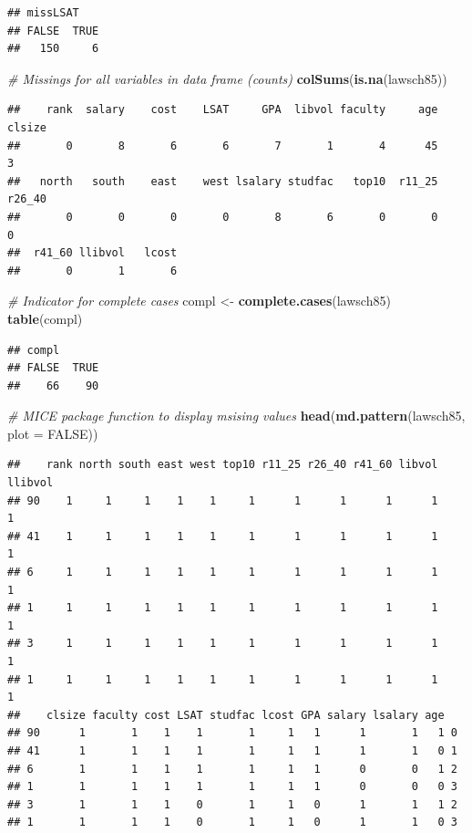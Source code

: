 \documentclass[]{book}
\newenvironment{Shaded}{\begin{snugshade}}{\end{snugshade}}
\newcommand{\CommentTok}[1]{\textcolor[rgb]{0.56,0.35,0.01}{\textit{#1}}}
\newcommand{\DataTypeTok}[1]{\textcolor[rgb]{0.13,0.29,0.53}{#1}}
\newcommand{\KeywordTok}[1]{\textcolor[rgb]{0.13,0.29,0.53}{\textbf{#1}}}
\newcommand{\NormalTok}[1]{#1}
\newcommand{\OtherTok}[1]{\textcolor[rgb]{0.56,0.35,0.01}{#1}}
\newcommand{\StringTok}[1]{\textcolor[rgb]{0.31,0.60,0.02}{#1}}
\begin{document}
\begin{verbatim}
## missLSAT
## FALSE  TRUE 
##   150     6
\end{verbatim}

\begin{Shaded}
\begin{Highlighting}[]
\CommentTok{# Missings for all variables in data frame (counts)}
\KeywordTok{colSums}\NormalTok{(}\KeywordTok{is.na}\NormalTok{(lawsch85))}
\end{Highlighting}
\end{Shaded}

\begin{verbatim}
##    rank  salary    cost    LSAT     GPA  libvol faculty     age  clsize 
##       0       8       6       6       7       1       4      45       3 
##   north   south    east    west lsalary studfac   top10  r11_25  r26_40 
##       0       0       0       0       8       6       0       0       0 
##  r41_60 llibvol   lcost 
##       0       1       6
\end{verbatim}

\begin{Shaded}
\begin{Highlighting}[]
\CommentTok{# Indicator for complete cases}
\NormalTok{compl <-}\StringTok{ }\KeywordTok{complete.cases}\NormalTok{(lawsch85)}
\KeywordTok{table}\NormalTok{(compl)}
\end{Highlighting}
\end{Shaded}

\begin{verbatim}
## compl
## FALSE  TRUE 
##    66    90
\end{verbatim}

\begin{Shaded}
\begin{Highlighting}[]
\CommentTok{# MICE package function to display msising values }
\KeywordTok{head}\NormalTok{(}\KeywordTok{md.pattern}\NormalTok{(lawsch85, }\DataTypeTok{plot =} \OtherTok{FALSE}\NormalTok{)) }
\end{Highlighting}
\end{Shaded}

\begin{verbatim}
##    rank north south east west top10 r11_25 r26_40 r41_60 libvol llibvol
## 90    1     1     1    1    1     1      1      1      1      1       1
## 41    1     1     1    1    1     1      1      1      1      1       1
## 6     1     1     1    1    1     1      1      1      1      1       1
## 1     1     1     1    1    1     1      1      1      1      1       1
## 3     1     1     1    1    1     1      1      1      1      1       1
## 1     1     1     1    1    1     1      1      1      1      1       1
##    clsize faculty cost LSAT studfac lcost GPA salary lsalary age  
## 90      1       1    1    1       1     1   1      1       1   1 0
## 41      1       1    1    1       1     1   1      1       1   0 1
## 6       1       1    1    1       1     1   1      0       0   1 2
## 1       1       1    1    1       1     1   1      0       0   0 3
## 3       1       1    1    0       1     1   0      1       1   1 2
## 1       1       1    1    0       1     1   0      1       1   0 3
\end{verbatim}
\end{document}
